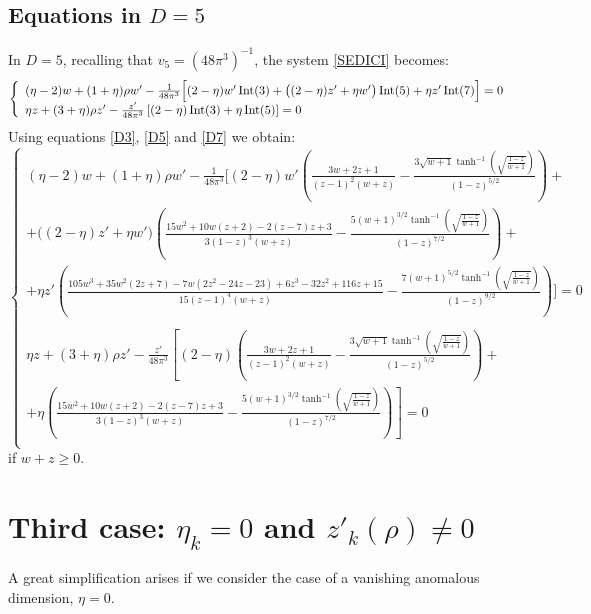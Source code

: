 \subsection{Equations in $D=5$}
In $D = 5$, recalling that $v_5 = (48\pi^3)^{-1}$, the system \eqref{SEDICI} becomes:
\begin{equation}
\left\{
\begin{array}{l}
 (\eta -2)w + (1 +\eta){\rho} w' - \frac{1}{48\pi^3}\Big[(2-\eta)w'\operatorname{Int}(3) + \big((2-\eta)z' + \eta w'\big)\operatorname{Int}(5) + \eta z'\operatorname{Int}(7)\Big] = 0\\
\eta {z}+ (3+\eta)\rho{z'}   - \frac{{z'}}{48\pi^3} \left[(2 - \eta)\operatorname{Int}(3) + \eta \operatorname{Int}(5)\right] = 0\\
\end{array}
\right.
\end{equation}
Using equations \eqref{D3}, \eqref{D5} and \eqref{D7} we obtain:
\begin{equation} 
\left\{
\begin{array}{l}
 (\eta -2)w + (1 +\eta){\rho} w' - \frac{1}{48\pi^3}\Big[(2-\eta)w'\left(\frac{3 w+2 z+1}{(z-1)^2 (w+z)}-\frac{3 \sqrt{w+1} \tanh ^{-1}\left(\sqrt{\frac{1-z}{w+1}}\right)}{(1-z)^{5/2}}\right) +\\
 + \big((2-\eta)z' + \eta w'\big)\left(\frac{15 w^2+10 w (z+2)-2 (z-7) z+3}{3 (1-z)^3 (w+z)}-\frac{5 (w+1)^{3/2} \tanh ^{-1}\left(\sqrt{\frac{1-z}{w+1}}\right)}{(1-z)^{7/2}}\right) +\\
 + \eta z'\left(\frac{105 w^3+35 w^2 (2 z+7)-7 w \left(2 z^2-24 z-23\right)+6 z^3-32 z^2+116 z+15}{15 (z-1)^4 (w+z)}- \frac{7 (w+1)^{5/2} \tanh ^{-1}\left(\sqrt{\frac{1-z}{w+1}}\right)}{(1-z)^{9/2}}\right)\Big] = 0\\
\\ \eta {z} + (3+\eta)\rho{z'}  - \frac{{z'}}{48\pi^3} \left[(2 - \eta)\left(\frac{3 w+2 z+1}{(z-1)^2 (w+z)}-\frac{3 \sqrt{w+1} \tanh ^{-1}\left(\sqrt{\frac{1-z}{w+1}}\right)}{(1-z)^{5/2}}\right) \right. + \\ + \left. \eta \left(\frac{15 w^2+10 w (z+2)-2 (z-7) z+3}{3 (1-z)^3 (w+z)}-\frac{5 (w+1)^{3/2} \tanh ^{-1}\left(\sqrt{\frac{1-z}{w+1}}\right)}{(1-z)^{7/2}}\right)\right] = 0\\
\end{array}
\right.
\end{equation}
if $ w + z \geq 0$.

\section{Third case: $\eta_k = 0$ and $z'_k(\rho)\neq 0$}
A great simplification arises if we consider the case of a vanishing anomalous dimension, $\eta = 0$. 

